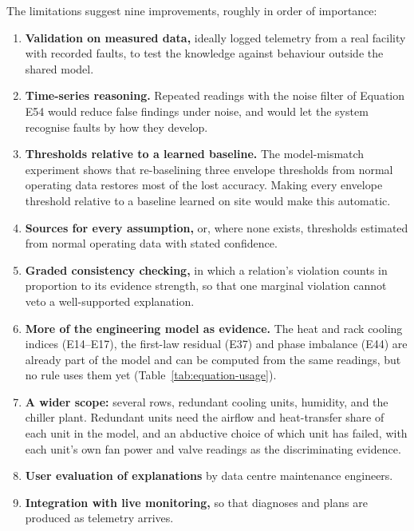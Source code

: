 The limitations suggest nine improvements, roughly in order of importance:
\begin{enumerate}
  \item \textbf{Validation on measured data,} ideally logged telemetry from a real facility with recorded faults, to test the knowledge against behaviour outside the shared model.
  \item \textbf{Time-series reasoning.} Repeated readings with the noise filter of Equation E54 would reduce false findings under noise, and would let the system recognise faults by how they develop.
  \item \textbf{Thresholds relative to a learned baseline.} The model-mismatch experiment shows that re-baselining three envelope thresholds from normal operating data restores most of the lost accuracy. Making every envelope threshold relative to a baseline learned on site would make this automatic.
  \item \textbf{Sources for every assumption,} or, where none exists, thresholds estimated from normal operating data with stated confidence.
  \item \textbf{Graded consistency checking,} in which a relation's violation counts in proportion to its evidence strength, so that one marginal violation cannot veto a well-supported explanation.
  \item \textbf{More of the engineering model as evidence.} The heat and rack cooling indices (E14--E17), the first-law residual (E37) and phase imbalance (E44) are already part of the model and can be computed from the same readings, but no rule uses them yet (Table~\ref{tab:equation-usage}).
  \item \textbf{A wider scope:} several rows, redundant cooling units, humidity, and the chiller plant. Redundant units need the airflow and heat-transfer share of each unit in the model, and an abductive choice of which unit has failed, with each unit's own fan power and valve readings as the discriminating evidence.
  \item \textbf{User evaluation of explanations} by data centre maintenance engineers.
  \item \textbf{Integration with live monitoring,} so that diagnoses and plans are produced as telemetry arrives.
\end{enumerate}
